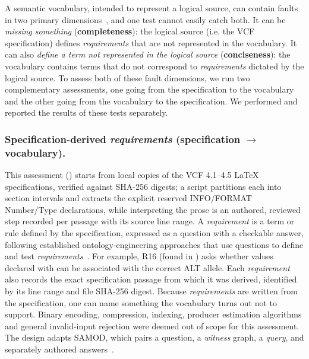 A semantic vocabulary, intended to represent a logical source, can contain faults in two primary dimensions~\cite{gomezperez2001evaluation}, and one test cannot easily catch both.
It can be \emph{missing something} (\textbf{completeness}): the logical source (i.e. the VCF specification) defines \emph{requirements} that are not represented in the vocabulary.
It can also \emph{define a term not represented in the logical source} (\textbf{conciseness}): the vocabulary contains terms that do not correspond to \emph{requirements} dictated by the logical source.
To assess both of these fault dimensions, we run two complementary assessments, one going from the specification to the vocabulary~\cite{sabou2012ontologyevaluation} and the other going from the vocabulary to the specification.
We performed and reported the results of these tests separately.

\subsubsection{Specification-derived \emph{requirements} (specification $\rightarrow$ vocabulary).}
This assessment () starts from local copies of the VCF 4.1--4.5 \LaTeX{} specifications, verified against SHA-256 digests; a script partitions each into section intervals and extracts the explicit reserved INFO/FORMAT Number/Type declarations, while interpreting the prose is an authored, reviewed step recorded per passage with its source line range.
A \emph{requirement} is a term or rule defined by the specification, expressed as a question with a checkable answer, following established ontology-engineering approaches that use questions to define and test \emph{requirements}~\cite{gruninger1995methodology,suarezfigueroa2009orsd,lot2022}.
For example, R16 (found in ) asks whether values declared with  can be associated with the correct ALT allele. 
Each \emph{requirement} also records the exact specification passage from which it was derived, identified by its line range and file SHA-256 digest.
Because \emph{requirements} are written from the specification, one can name something the vocabulary turns out not to support.
Binary encoding, compression, indexing, producer estimation algorithms and general invalid-input rejection were deemed out of scope for this assessment.
The design adapts SAMOD, which pairs a question, a \emph{witness} graph, a \emph{query}, and separately authored answers~\cite{samod2016}.

